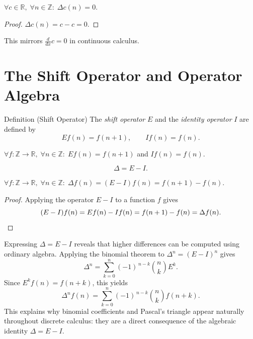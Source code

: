 \begin{remark*}
\(\forall c \in \mathbb{R},\; \forall n \in \mathbb{Z}:\; \Delta c(n) = 0\).
\end{remark*}

\begin{proof}
\(\Delta c(n) = c - c = 0\).
\end{proof}

\begin{remark*}[Analogy]
This mirrors \(\tfrac{d}{dx} c = 0\) in continuous calculus.
\end{remark*}

\section*{The Shift Operator and Operator Algebra}

\begin{definitionbox}{Definition (Shift Operator)}
The \emph{shift operator} \(E\) and the \emph{identity operator} \(I\)
are defined by
\[
Ef(n) = f(n+1), \qquad If(n) = f(n).
\]
\end{definitionbox}
\label{def:shift-operator}

\begin{remark*}
\(\forall f : \mathbb{Z}\to\mathbb{R},\; \forall n \in \mathbb{Z}:\;
Ef(n) = f(n+1)\) and \(If(n) = f(n)\).
\end{remark*}

\begin{theorem}[\(\Delta = E - I\)]
\label{thm:delta-E-minus-I}
\[
\Delta = E - I.
\]
\end{theorem}

\begin{remark*}
\(\forall f : \mathbb{Z}\to\mathbb{R},\; \forall n \in \mathbb{Z}:\;
\Delta f(n) = (E-I)f(n) = f(n+1) - f(n)\).
\end{remark*}

\begin{proof}
Applying the operator \(E-I\) to a function \(f\) gives
\[
(E-I)f(n) = Ef(n) - If(n) = f(n+1) - f(n) = \Delta f(n). \qedhere
\]
\end{proof}

\begin{remark*}
Expressing \(\Delta = E - I\) reveals that higher differences can be
computed using ordinary algebra. Applying the binomial theorem to
\(\Delta^n = (E-I)^n\) gives
\[
\Delta^n
=
\sum_{k=0}^{n}
(-1)^{\,n-k}
\binom{n}{k}
E^{k}.
\]
Since \(E^k f(n) = f(n+k)\), this yields
\[
\Delta^n f(n)
=
\sum_{k=0}^{n}
(-1)^{\,n-k}
\binom{n}{k}
f(n+k).
\]
This explains why binomial coefficients and Pascal's triangle appear
naturally throughout discrete calculus: they are a direct consequence
of the algebraic identity \(\Delta = E - I\).
\end{remark*}

